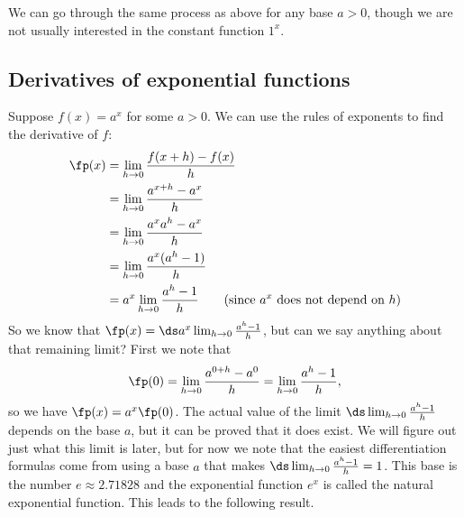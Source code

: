 We can go through the same process as above for any base $a>0$, though we are not usually interested in the constant function $1^x$.


\subsection*{Derivatives of exponential functions}

Suppose $f(x)=a^x$ for some $a>0$. We can use the rules of exponents to find the derivative of $f$:
\begin{align*}
	\fp(x)
	&=\lim_{h\to 0}\frac{f(x+h)-f(x)}{h}\\
	&=\lim_{h\to 0}\frac{a^{x+h}-a^x}{h}\\
	&=\lim_{h\to 0}\frac{a^xa^h-a^x}{h}\\
	&=\lim_{h\to 0}\frac{a^x(a^h-1)}{h}\\
	&=a^x\lim_{h\to 0}\frac{a^h-1}{h} \qquad\text{(since $a^x$ does not depend on $h$)}\\
\end{align*}
So we know that $\fp(x)=\ds a^x \lim_{h\to 0}\frac{a^h-1}{h}$, but can we say anything about that remaining limit? First we note that
\[\fp(0)=\lim_{h\to 0}\frac  {a^{0+h}-a^0}{h}=\lim_{h\to 0}\frac{a^h-1}{h},\]
so we have $\fp(x)=a^x\fp(0)$. The actual value of the limit $\ds\lim_{h\to 0}\frac{a^h-1}{h}$ depends on the base $a$, but it can be proved that it does exist. We will figure out just what this limit is later, but for now we note that the easiest differentiation formulas come from using a base $a$ that makes $\ds\lim_{h\to 0}\frac{a^h-1}{h}=1$. This base is the
number $e\approx 2.71828$ and the exponential function $e^x$ is called the natural exponential function. This leads to the following result.

